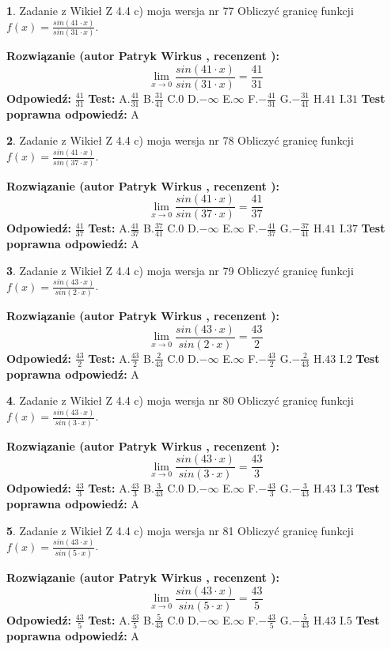 \documentclass[12pt, a4paper]{article}
\theoremstyle{definition} %
\newtheorem{zad}{}
\newcommand{\zadStart}[1]{\begin{zad}#1\newline}
\newcommand{\zadStop}{\end{zad}}
\newcommand{\rozwStart}[2]{\noindent \textbf{Rozwiązanie (autor #1 , recenzent #2): }\newline}
\newcommand{\rozwStop}{\newline}
\newcommand{\odpStart}{\noindent \textbf{Odpowiedź:}\newline}
\newcommand{\odpStop}{\newline}
\newcommand{\testStart}{\noindent \textbf{Test:}\newline}
\newcommand{\testStop}{\newline}
\newcommand{\kluczStart}{\noindent \textbf{Test poprawna odpowiedź:}\newline}
\newcommand{\kluczStop}{\newline}
\begin{document}
\zadStart{Zadanie z Wikieł Z 4.4 c) moja wersja nr 77}
Obliczyć granicę funkcji $f(x)=\frac{sin(41\cdot x)}{sin(31\cdot x)}$.
\zadStop
\rozwStart{Patryk Wirkus}{}
$$\lim\limits_{x\to 0}\frac{sin(41\cdot x)}{sin(31\cdot x)}=
\frac{41}{31}$$
\rozwStop
\odpStart
$\frac{41}{31}$
\odpStop
\testStart
A.$\frac{41}{31}$
B.$\frac{31}{41}$
C.$0$
D.$-\infty$
E.$\infty$
F.$-\frac{41}{31}$
G.$-\frac{31}{41}$
H.$41$
I.$31$
\testStop
\kluczStart
A
\kluczStop



\zadStart{Zadanie z Wikieł Z 4.4 c) moja wersja nr 78}
Obliczyć granicę funkcji $f(x)=\frac{sin(41\cdot x)}{sin(37\cdot x)}$.
\zadStop
\rozwStart{Patryk Wirkus}{}
$$\lim\limits_{x\to 0}\frac{sin(41\cdot x)}{sin(37\cdot x)}=
\frac{41}{37}$$
\rozwStop
\odpStart
$\frac{41}{37}$
\odpStop
\testStart
A.$\frac{41}{37}$
B.$\frac{37}{41}$
C.$0$
D.$-\infty$
E.$\infty$
F.$-\frac{41}{37}$
G.$-\frac{37}{41}$
H.$41$
I.$37$
\testStop
\kluczStart
A
\kluczStop



\zadStart{Zadanie z Wikieł Z 4.4 c) moja wersja nr 79}
Obliczyć granicę funkcji $f(x)=\frac{sin(43\cdot x)}{sin(2\cdot x)}$.
\zadStop
\rozwStart{Patryk Wirkus}{}
$$\lim\limits_{x\to 0}\frac{sin(43\cdot x)}{sin(2\cdot x)}=
\frac{43}{2}$$
\rozwStop
\odpStart
$\frac{43}{2}$
\odpStop
\testStart
A.$\frac{43}{2}$
B.$\frac{2}{43}$
C.$0$
D.$-\infty$
E.$\infty$
F.$-\frac{43}{2}$
G.$-\frac{2}{43}$
H.$43$
I.$2$
\testStop
\kluczStart
A
\kluczStop



\zadStart{Zadanie z Wikieł Z 4.4 c) moja wersja nr 80}
Obliczyć granicę funkcji $f(x)=\frac{sin(43\cdot x)}{sin(3\cdot x)}$.
\zadStop
\rozwStart{Patryk Wirkus}{}
$$\lim\limits_{x\to 0}\frac{sin(43\cdot x)}{sin(3\cdot x)}=
\frac{43}{3}$$
\rozwStop
\odpStart
$\frac{43}{3}$
\odpStop
\testStart
A.$\frac{43}{3}$
B.$\frac{3}{43}$
C.$0$
D.$-\infty$
E.$\infty$
F.$-\frac{43}{3}$
G.$-\frac{3}{43}$
H.$43$
I.$3$
\testStop
\kluczStart
A
\kluczStop



\zadStart{Zadanie z Wikieł Z 4.4 c) moja wersja nr 81}
Obliczyć granicę funkcji $f(x)=\frac{sin(43\cdot x)}{sin(5\cdot x)}$.
\zadStop
\rozwStart{Patryk Wirkus}{}
$$\lim\limits_{x\to 0}\frac{sin(43\cdot x)}{sin(5\cdot x)}=
\frac{43}{5}$$
\rozwStop
\odpStart
$\frac{43}{5}$
\odpStop
\testStart
A.$\frac{43}{5}$
B.$\frac{5}{43}$
C.$0$
D.$-\infty$
E.$\infty$
F.$-\frac{43}{5}$
G.$-\frac{5}{43}$
H.$43$
I.$5$
\testStop
\kluczStart
A
\kluczStop
\end{document}
